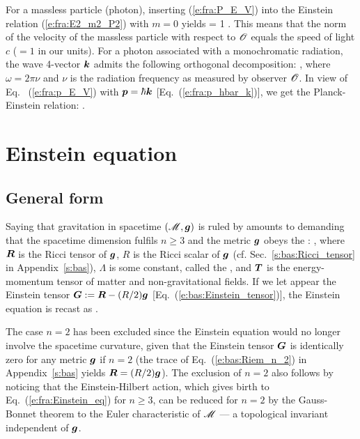 For a massless particle (photon), inserting (\ref{e:fra:P_E_V}) into the
Einstein relation (\ref{e:fra:E2_m2_P2}) with $m=0$ yields
\be \label{e:fra:photon_V_one}
    \cdot{} = 1 .
\ee
This means that the norm of the velocity of the massless particle with respect to $\mathscr{O}$
equals the speed of light $c$ ($=1$ in our units).
For a photon associated with a monochromatic radiation, the wave 4-vector $\bm{k}$
admits the following orthogonal decomposition:
\be
   ,
\ee
where $\omega = 2\pi \nu$ and $\nu$ is the radiation frequency as measured by
observer $\mathscr{O}$. In view of Eq.~ (\ref{e:fra:p_E_V}) with $\bm{p} = \hbar\bm{k}$
[Eq.~(\ref{e:fra:p_hbar_k})], we
get the Planck-Einstein relation:
\be \label{e:fra:Planck_Einstein}
    .
\ee

\section{Einstein equation} \label{s:fra:Einstein_eq}

\subsection{General form}

Saying that gravitation in spacetime $(\mathscr{M}, \bm{g})$ is ruled by
 amounts
to demanding that the spacetime dimension fulfils $n\geq 3$ and
the metric $\bm{g}$ obeys the :
\be \label{e:fra:Einstein_eq}
    ,
\ee
where $\bm{R}$ is the Ricci tensor of $\bm{g}$, $R$ is the
Ricci scalar of $\bm{g}$
(cf. Sec.~\ref{s:bas:Ricci_tensor} in Appendix~\ref{s:bas}), $\Lambda$ is some
constant, called the ,
and $\bm{T}$ is the energy-momentum tensor of
matter and non-gravitational fields. If we let appear the
Einstein tensor $\bm{G} := \bm{R} - (R/2) \bm{g}$
[Eq.~(\ref{e:bas:Einstein_tensor})], the Einstein equation is recast as
\be \label{e:fra:Einstein_eq_G}
    .
\ee

\begin{remark} \label{r:fra:Einstein_eq_n_2}
The case $n=2$ has been excluded since the Einstein equation would
no longer involve the spacetime curvature, given that the Einstein tensor
$\bm{G}$ is identically zero for any metric $\bm{g}$ if $n=2$
(the trace of Eq.~(\ref{e:bas:Riem_n_2}) in Appendix~\ref{s:bas} yields
$\bm{R} = (R/2) \bm{g}$).
The exclusion of $n=2$ also follows by noticing that
the Einstein-Hilbert action,
which gives birth to Eq.~(\ref{e:fra:Einstein_eq})
for $n\geq 3$, can be reduced for $n=2$
by the Gauss-Bonnet theorem to the
Euler characteristic
of $\mathscr{M}$ --- a topological invariant independent of $\bm{g}$.
\end{remark}

